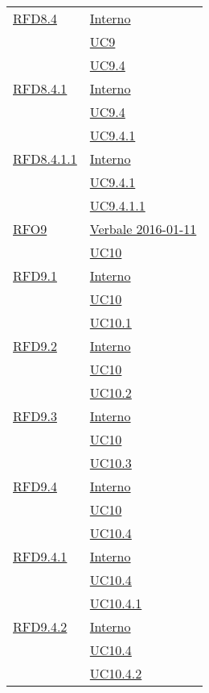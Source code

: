 \begin{longtable}{|>{\centering}m{5cm}|m{5cm}<{\centering}|}
\hyperlink{RFD8.4}{RFD8.4} & \hyperlink{Interno}{Interno}\\
& \hyperref[UC9]{UC9}\\
& \hyperref[UC9.4]{UC9.4}\\ \hline

\hyperlink{RFD8.4.1}{RFD8.4.1} & \hyperlink{Interno}{Interno}\\
& \hyperref[UC9.4]{UC9.4}\\
& \hyperref[UC9.4.1]{UC9.4.1}\\ \hline

\hyperlink{RFD8.4.1.1}{RFD8.4.1.1} & \hyperlink{Interno}{Interno}\\
& \hyperref[UC9.4.1]{UC9.4.1}\\
& \hyperref[UC9.4.1.1]{UC9.4.1.1}\\ \hline

\hyperlink{RFO9}{RFO9} & \hyperlink{Verbale 2016-01-11}{Verbale 2016-01-11}\\
& \hyperref[UC10]{UC10}\\ \hline

\hyperlink{RFD9.1}{RFD9.1} & \hyperlink{Interno}{Interno}\\
& \hyperref[UC10]{UC10}\\
& \hyperref[UC10.1]{UC10.1}\\ \hline

\hyperlink{RFD9.2}{RFD9.2} & \hyperlink{Interno}{Interno}\\
& \hyperref[UC10]{UC10}\\
& \hyperref[UC10.2]{UC10.2}\\ \hline

\hyperlink{RFD9.3}{RFD9.3} & \hyperlink{Interno}{Interno}\\
& \hyperref[UC10]{UC10}\\
& \hyperref[UC10.3]{UC10.3}\\ \hline

\hyperlink{RFD9.4}{RFD9.4} & \hyperlink{Interno}{Interno}\\
& \hyperref[UC10]{UC10}\\
& \hyperref[UC10.4]{UC10.4}\\ \hline

\hyperlink{RFD9.4.1}{RFD9.4.1} & \hyperlink{Interno}{Interno}\\
& \hyperref[UC10.4]{UC10.4}\\
& \hyperref[UC10.4.1]{UC10.4.1}\\ \hline

\hyperlink{RFD9.4.2}{RFD9.4.2} & \hyperlink{Interno}{Interno}\\
& \hyperref[UC10.4]{UC10.4}\\
& \hyperref[UC10.4.2]{UC10.4.2}\\ \hline


\end{longtable}

